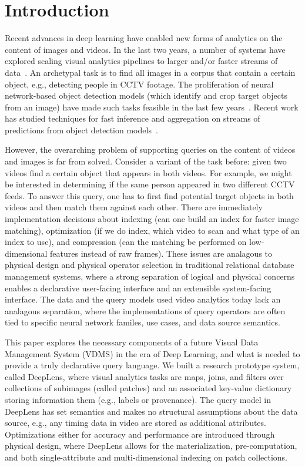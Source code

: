 \section{Introduction}\label{intro}\sloppy
Recent advances in deep learning have enabled new forms of analytics on the content of images and videos. In the last two years, a number of systems have explored scaling visual analytics pipelines to larger and/or faster streams of data~\cite{anderson2018predicate, kang2018blazeit,kang2017noscope, wu2018querying, sparks2017keystoneml,haynes2018lightdb}. An archetypal task is to find all images in a corpus that contain a certain object, e.g., detecting people in CCTV footage. The proliferation of neural network-based object detection models (which identify and crop target objects from an image) have made such tasks feasible in the last few years~\cite{he2017mask}. Recent work has studied techniques for fast inference and aggregation on streams of predictions from object detection models~\cite{kang2018blazeit,kang2017noscope}.


However, the overarching problem of supporting queries on the content of videos and images is far from solved. Consider a variant of the task before: given two videos find a certain object that appears in both videos. For example, we might be interested in determining if the same person appeared in two different CCTV feeds. To answer this query, one has to first find potential target objects in both videos and then match them against each other. There are immediately implementation decisions about indexing (can one build an index for faster image matching), optimization (if we do index, which video to scan and what type of an index to use), and compression (can the matching be performed on low-dimensional features instead of raw frames).  These issues are analagous to physical design and physical operator selection in traditional relational database management systems, where a strong separation of logical and physical concerns enables a declarative user-facing interface and an extensible system-facing interface. The data and the query models used video analytics today lack an analagous separation, where the implementations of query operators are often tied to specific neural network familes, use cases, and data source semantics.



This paper explores the necessary components of a future Visual Data Management System (VDMS) in the era of Deep Learning, and what is needed to provide a truly declarative query language.
We built a research prototype system, called \textsf{DeepLens}, where visual analytics tasks are maps, joins, and filters over collections of subimages (called patches) and an associated key-value dictionary storing information them (e.g., labels or provenance). The query model in \textsf{DeepLens} has set semantics and makes no structural assumptions about the data source, e.g., any timing data in video are stored as additional attributes. Optimizations either for accuracy and performance are introduced through physical design, where \textsf{DeepLens} allows for the materialization, pre-computation, and both single-attribute and multi-dimensional indexing on patch collections.


